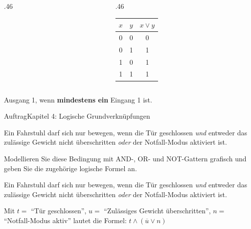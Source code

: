 \begin{frame}
\begin{columns}[c,onlytextwidth]
\begin{column}{.46\textwidth}

\end{column}
\begin{column}{.46\textwidth}
\begin{tabular}{ccc}
    $x$ & $y$ & $x \vee y$ \\\midrule
    0 & 0 & 0 \\
    0 & 1 & 1 \\
    1 & 0 & 1 \\
    1 & 1 & 1 \\
\end{tabular}
\end{column}
\end{columns}
\vspace{3mm}
\begin{center}Ausgang 1, wenn \textbf{mindestens ein} Eingang 1 ist.\end{center}
\end{frame}

\begin{frame}{Auftrag}{Kapitel 4: Logische Grundverknüpfungen}
\begin{center}
Ein Fahrstuhl darf sich nur bewegen, wenn die Tür geschlossen \emph{und} entweder das zulässige Gewicht nicht überschritten \emph{oder} der Notfall-Modus aktiviert ist.
\vspace{4mm}

Modellieren Sie diese Bedingung mit AND-, OR- und NOT-Gattern grafisch und geben Sie die zugehörige logische Formel an.
\end{center}
\end{frame}

\begin{frame}
\begin{center}
Ein Fahrstuhl darf sich nur bewegen, wenn die Tür geschlossen \emph{und} entweder das zulässige Gewicht nicht überschritten \emph{oder} der Notfall-Modus aktiviert ist.
\end{center}
\begin{center}
Mit $t=$ \enquote{Tür geschlossen}, $u=$ \enquote{Zulässiges Gewicht überschritten}, $n=$ \enquote{Notfall-Modus aktiv} lautet die Formel:
\large $t \wedge (\overline{u} \vee n)$\end{center}
    \centering
    
\end{frame}
